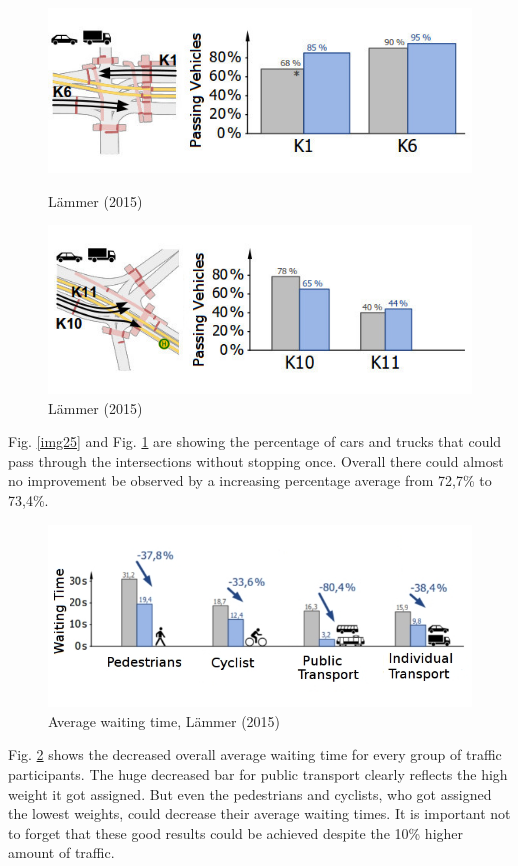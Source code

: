 \begin{figure} [!htb]
	\centering
	\includegraphics[scale=0.43]{pic/k6_durchfahrer.jpg}
	\caption{ L\"ammer (2015) \cite{laemmer15}}
	\label{img25}

	\centering
	\includegraphics[scale=0.43]{pic/k7_durchfahrer.jpg}
	\caption{L\"ammer (2015) \cite{laemmer15}}
	\label{img26}
\end{figure}

Fig. \ref{img25} and Fig. \ref{img26} are showing the percentage of cars and trucks that could pass through the intersections without stopping once. Overall there could almost no improvement be observed by a increasing percentage average from 72,7\% to 73,4\%. 


\begin{figure} [!htb]
	\centering
	\includegraphics[scale=0.39]{pic/sc_results.jpeg}
	\caption{Average waiting time, L\"ammer (2015) \cite{laemmer15}}
	\label{img42}
\end{figure}

Fig. \ref{img42} shows the decreased overall average waiting time for every group of traffic participants. The huge decreased bar for public transport clearly reflects the high weight it got assigned. But even the pedestrians and cyclists, who got assigned the lowest weights, could decrease their average waiting times. It is important not to forget that these good results could be achieved despite the 10\% higher amount of traffic.
